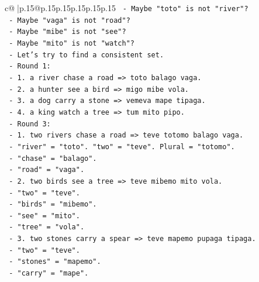 \documentclass{article}
\begin{document}
{\begin{supertabular}{c@{$\;$}|p{.15\linewidth}@{}p{.15\linewidth}p{.15\linewidth}p{.15\linewidth}p{.15\linewidth}p{.15\linewidth}}
{{{\texttt{                        {-} Maybe "toto" is not "river"?} \\
\texttt{                        {-} Maybe "vaga" is not "road"?} \\
\texttt{                        {-} Maybe "mibe" is not "see"?} \\
\texttt{                        {-} Maybe "mito" is not "watch"?} \\
\texttt{                      {-} Let's try to find a consistent set.} \\
\texttt{                        {-} Round 1:} \\
\texttt{                          {-} 1. a river chase a road => toto balago vaga.} \\
\texttt{                          {-} 2. a hunter see a bird => migo mibe vola.} \\
\texttt{                          {-} 3. a dog carry a stone => vemeva mape tipaga.} \\
\texttt{                          {-} 4. a king watch a tree => tum mito pipo.} \\
\texttt{                        {-} Round 3:} \\
\texttt{                          {-} 1. two rivers chase a road => teve totomo balago vaga.} \\
\texttt{                            {-} "river" = "toto". "two" = "teve". Plural = "totomo".} \\
\texttt{                            {-} "chase" = "balago".} \\
\texttt{                            {-} "road" = "vaga".} \\
\texttt{                          {-} 2. two birds see a tree => teve mibemo mito vola.} \\
\texttt{                            {-} "two" = "teve".} \\
\texttt{                            {-} "birds" = "mibemo".} \\
\texttt{                            {-} "see" = "mito".} \\
\texttt{                            {-} "tree" = "vola".} \\
\texttt{                          {-} 3. two stones carry a spear => teve mapemo pupaga tipaga.} \\
\texttt{                            {-} "two" = "teve".} \\
\texttt{                            {-} "stones" = "mapemo".} \\
\texttt{                            {-} "carry" = "mape".} \\
}}}
\end{supertabular}}
\end{document}
